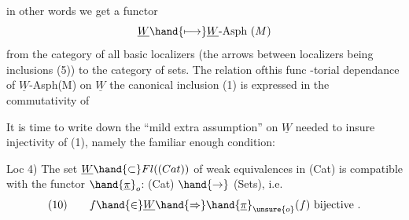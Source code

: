 in other words we get a functor
\[ \underline{W} \hand{\longmapsto} \underline{W}\text{-Asph }(M) \]
from the category of all basic localizers (the arrows between localizers
being inclusions (5))  to the category of sets.  The relation of\hand{$|$}this func%
-torial dependance  of  $\underline{W}$-Asph(M) on $\underline{W}$   \hand{(}the canonical inclusion (1) \hand{)}
is expressed in the commutativity of

It is time to write down the ``mild extra assumption'' on $\underline{W}$ needed to
insure injectivity of (1),  namely the familiar enough condition:

Loc 4)  The set $\underline{W} \hand{\subset} Fl((Cat))$ of weak equivalences in (Cat)  is compatible
with the functor $\hand{\underline{\pi}}_o$: (Cat) $\hand{\to}$ (Sets),  i.e.
\[ (10) \qquad f \hand{\in} \underline{W} \hand{\Rightarrow} \hand{\underline{\pi}}_{\unsure{o}}(f) \text{  bijective .} \]

